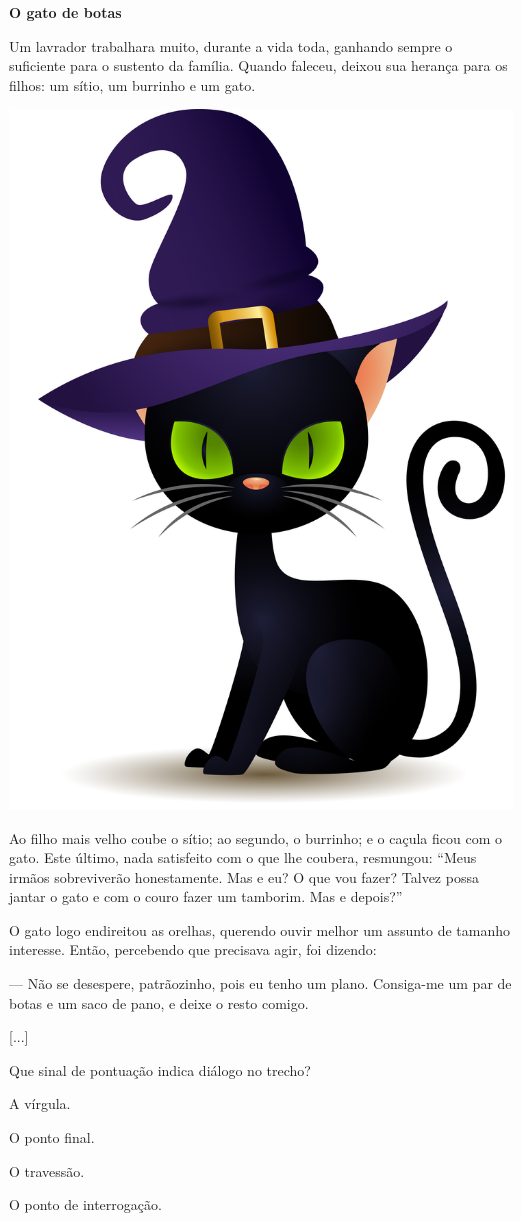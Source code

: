 \begin{myquote}
\textbf{O gato de botas}

Um lavrador trabalhara muito, durante a vida toda, ganhando sempre o
suficiente para o sustento da família. Quando faleceu, deixou sua
herança para os filhos: um sítio, um burrinho e um gato.

\begin{center}
\includegraphics[width=.4\textwidth]{./media/image7a.png}
\end{center}

Ao filho mais velho coube o sítio; ao segundo, o burrinho; e o caçula
ficou com o gato. Este último, nada satisfeito com o que lhe coubera,
resmungou: ``Meus irmãos sobreviverão honestamente. Mas e eu? O que vou
fazer? Talvez possa jantar o gato e com o couro fazer um tamborim. Mas e
depois?''

O gato logo endireitou as orelhas, querendo ouvir melhor um assunto de
tamanho interesse. Então, percebendo que precisava agir, foi dizendo:

--- Não se desespere, patrãozinho, pois eu tenho um plano. Consiga-me um
par de botas e um saco de pano, e deixe o resto comigo.

{[}...{]}

\end{myquote}

Que sinal de pontuação indica diálogo no trecho?

\begin{escolha}[itemsep=-5pt]
\item
  A vírgula.
\item
  O ponto final.
\item
  O travessão.
\item
  O ponto de interrogação.
\end{escolha}


